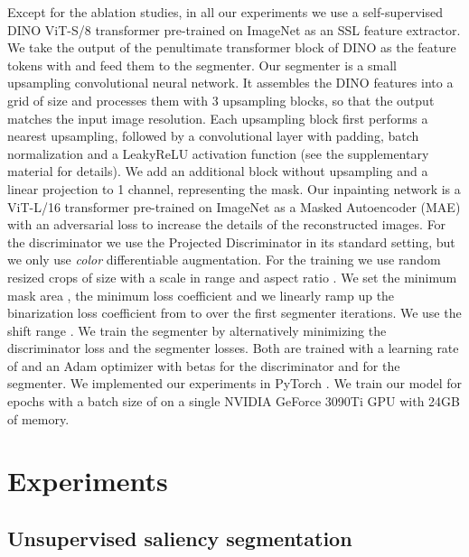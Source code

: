 \documentclass{article}
\begin{document}
Except for the ablation studies,  in all our experiments we use a self-supervised DINO \cite{caron2021emerging} ViT-S/8 transformer pre-trained on ImageNet \cite{imagenet} as an SSL feature extractor. 
We take the output of the penultimate transformer block of DINO as the feature tokens with  and feed them to the segmenter.
Our segmenter is a small upsampling convolutional neural network. It assembles the DINO features into a grid of size  and processes them with 3 upsampling blocks, so that the output matches the input image resolution. Each upsampling block first performs a  nearest upsampling, followed by a  convolutional layer with padding, batch normalization \cite{ioffe2015batch} and a LeakyReLU activation function (see the supplementary material for details). We add an additional block without upsampling and a linear projection to 1 channel, representing the mask.
Our inpainting network is a ViT-L/16 transformer pre-trained on ImageNet as a Masked Autoencoder (MAE) \cite{he2021masked} with an adversarial loss to increase the details of the reconstructed images. For the discriminator we use the Projected Discriminator \cite{Sauer2021NEURIPS} in its standard setting, but we only use \textit{color} differentiable augmentation.
For the training we use random resized crops of size  with a scale in range  and aspect ratio .
We set the minimum mask area , the minimum loss coefficient  and we linearly ramp up the binarization loss coefficient  from  to  over the first  segmenter iterations.
We use the shift range . We train the segmenter by alternatively minimizing the discriminator loss and the segmenter losses. Both are trained with a learning rate of  and an Adam \cite{kingmaAdam} optimizer with betas  for the discriminator and  for the segmenter. We implemented our experiments in PyTorch \cite{pytorch}. We train our model for  epochs with a batch size of  on a single NVIDIA GeForce 3090Ti GPU with 24GB of memory.






    



\section{Experiments}












\subsection{Unsupervised saliency segmentation}
\label{sec:exp-saliency}
\end{document}
